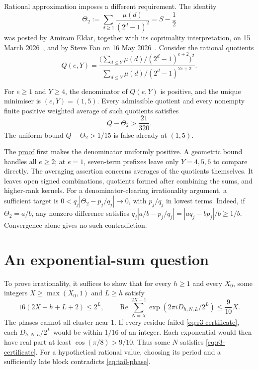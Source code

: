 \documentclass[11pt]{article}
\newcommand{\longrecord}[2]{\href{erdos249-totient-reasoning-surface.pdf\##1}{#2}}
\begin{document}
Rational approximation imposes a different requirement. The identity
\[
 \Theta_2:=\sum_{d\ge1}\frac{\mu(d)}{(2^d-1)^2}=S-\frac12
\]
was posted by Amiram Eldar, together with its coprimality interpretation,
on 15 March 2026~\cite{eldar2026oeis}, and by Steve Fan on
16 May 2026~\cite{fan2026totient}.
Consider the rational quotients
\[
 Q(e,Y)=\frac{\bigl(\sum_{d\le Y}\mu(d)/(2^d-1)^{e+2}\bigr)^2}
      {\sum_{d\le Y}\mu(d)/(2^d-1)^{2e+2}}.
\]
\begin{theorem}\label{res:rankonefloor}
For $e\ge1$ and $Y\ge4$, the denominator of $Q(e,Y)$ is positive, and the
unique minimiser is $(e,Y)=(1,5)$. Every admissible quotient and every
nonempty finite positive weighted average of such quotients satisfies
\[
 Q-\Theta_2>\frac{21}{320}.
\]
The uniform bound $Q-\Theta_2>1/15$ is false already at $(1,5)$.
\end{theorem}
The \longrecord{long249-r3-rankone}{proof} first makes the denominator
uniformly positive. A geometric bound handles all $e\ge2$; at $e=1$,
seven-term prefixes leave only $Y=4,5,6$ to compare directly.
The averaging assertion concerns averages of the quotients themselves.
It leaves open signed combinations, quotients formed after combining
the sums, and higher-rank kernels. For a denominator-clearing
irrationality argument, a sufficient target is
$0<q_j|\Theta_2-p_j/q_j|\to0$, with $p_j/q_j$ in lowest terms.
Indeed, if $\Theta_2=a/b$, any nonzero difference satisfies
$q_j|a/b-p_j/q_j|=|a q_j-bp_j|/b\ge1/b$.
Convergence alone gives no such contradiction.

\section{An exponential-sum question}\label{sec:open}
To prove irrationality, it suffices to show that for every $h\ge1$
and every $X_0$, some integers $X\ge\max(X_0,1)$ and $L\ge h$ satisfy
\begin{equation}\label{eq:r3-harmonic}
 16(2X+h+L+2)\le2^L,\qquad
 \operatorname{Re}\sum_{N=X}^{2X-1}
       \exp(2\pi iD_{h,N,L}/2^L)\le\frac9{10}X.
\end{equation}
The phases cannot all cluster near $1$. If every residue failed
\eqref{eq:r3-certificate}, each $D_{h,N,L}/2^L$ would be within
$1/16$ of an integer. Each exponential would then have real part at least
$\cos(\pi/8)>9/10$. Thus some $N$ satisfies
\eqref{eq:r3-certificate}. For a hypothetical rational value, choosing
its period and a sufficiently late block contradicts
\eqref{eq:tail-phase}.
\end{document}
